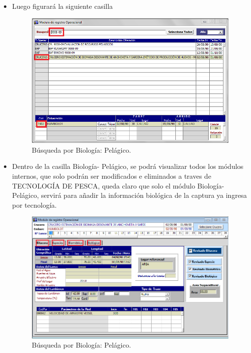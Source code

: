 \documentclass[a4paper,oneside,11pt]{book}
\begin{document}
\begin{itemize}
\item Luego figurará la siguiente casilla

\begin{figure} [!h]
\begin{center}
\includegraphics[scale=0.30]{imagen_manual_OPEMAR/rojo1.png}
\caption{Búsqueda por Biología: Pelágico.}
\end{center}
\end{figure}


\item Dentro de la casilla Biología- Pelágico, se podrá visualizar todos los módulos internos, que solo podrán ser modificados e eliminados a traves de TECNOLOGÍA DE PESCA, queda claro que solo el módulo Biología-Pelágico, servirá para añadir la información biológica de la captura ya ingresa  por tecnología. 


\begin{figure} [!h]
\begin{center}
\includegraphics[scale=0.35]{imagen_manual_OPEMAR/casillasardina.png}
\caption{Búsqueda por Biología: Pelágico.}
\end{center}
\end{figure}


\end{itemize}
\end{document}
